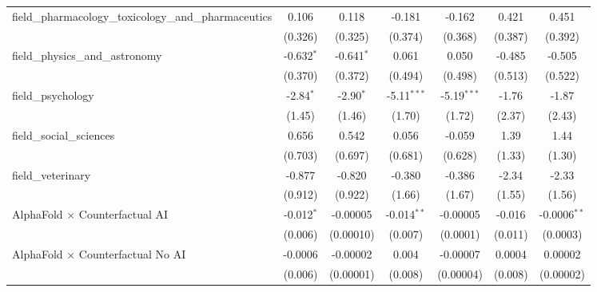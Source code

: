 \begin{tabular}{lcccccc}
   field\_pharmacology\_toxicology\_and\_pharmaceutics         & 0.106         & 0.118        & -0.181        & -0.162        & 0.421         & 0.451\\   
                                                               & (0.326)       & (0.325)      & (0.374)       & (0.368)       & (0.387)       & (0.392)\\   
   field\_physics\_and\_astronomy                              & -0.632$^{*}$  & -0.641$^{*}$ & 0.061         & 0.050         & -0.485        & -0.505\\   
                                                               & (0.370)       & (0.372)      & (0.494)       & (0.498)       & (0.513)       & (0.522)\\   
   field\_psychology                                           & -2.84$^{*}$   & -2.90$^{*}$  & -5.11$^{***}$ & -5.19$^{***}$ & -1.76         & -1.87\\   
                                                               & (1.45)        & (1.46)       & (1.70)        & (1.72)        & (2.37)        & (2.43)\\   
   field\_social\_sciences                                     & 0.656         & 0.542        & 0.056         & -0.059        & 1.39          & 1.44\\   
                                                               & (0.703)       & (0.697)      & (0.681)       & (0.628)       & (1.33)        & (1.30)\\   
   field\_veterinary                                           & -0.877        & -0.820       & -0.380        & -0.386        & -2.34         & -2.33\\   
                                                               & (0.912)       & (0.922)      & (1.66)        & (1.67)        & (1.55)        & (1.56)\\   
   AlphaFold $\times$ Counterfactual AI                        & -0.012$^{*}$  & -0.00005     & -0.014$^{**}$ & -0.00005      & -0.016        & -0.0006$^{**}$\\   
                                                               & (0.006)       & (0.00010)    & (0.007)       & (0.0001)      & (0.011)       & (0.0003)\\   
   AlphaFold $\times$ Counterfactual No AI                     & -0.0006       & -0.00002     & 0.004         & -0.00007      & 0.0004        & 0.00002\\   
                                                               & (0.006)       & (0.00001)    & (0.008)       & (0.00004)     & (0.008)       & (0.00002)\\   

\end{tabular}
